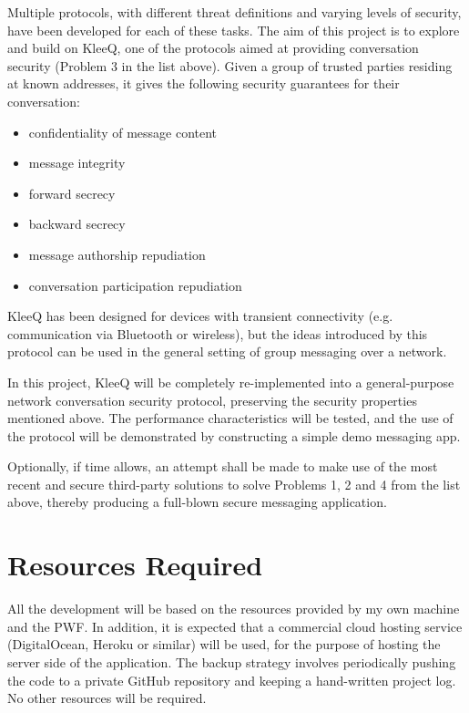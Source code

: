 \documentclass[a4paper, 12pt]{report}
\begin{document}
\begin{appendices}
\vspace{\baselineskip}
\noindent
Multiple protocols, with different threat definitions and varying levels of security, have been developed for each of these tasks. The aim of this project is to explore and build on KleeQ, one of the protocols aimed at providing conversation security (Problem 3 in the list above). Given a group of trusted parties residing at known addresses, it gives the following security guarantees for their conversation:
\begin{itemize}
    \item confidentiality of message content
    \item message integrity
    \item forward secrecy
    \item backward secrecy
    \item message authorship repudiation
    \item conversation participation repudiation
\end{itemize}
KleeQ has been designed for devices with transient connectivity (e.g. communication via Bluetooth or wireless), but the ideas introduced by this protocol can be used in the general setting of group messaging over a network.

\vspace{\baselineskip}
\noindent
In this project, KleeQ will be completely re-implemented into a general-purpose network conversation security protocol, preserving the security properties mentioned above. The performance characteristics will be tested, and the use of the protocol will be demonstrated by constructing a simple demo messaging app.

\vspace{\baselineskip}
\noindent
Optionally, if time allows, an attempt shall be made to make use of the most recent and secure third-party solutions to solve Problems 1, 2 and 4 from the list above, thereby producing a full-blown secure messaging application.


\section{Resources Required}
All the development will be based on the resources provided by my own machine and the PWF. In addition, it is expected that a commercial cloud hosting service (DigitalOcean, Heroku or similar) will be used, for the purpose of hosting the server side of the application. The backup strategy involves periodically pushing the code to a private GitHub repository and keeping a hand-written project log. No other resources will be required.



\end{appendices}
\end{document}
